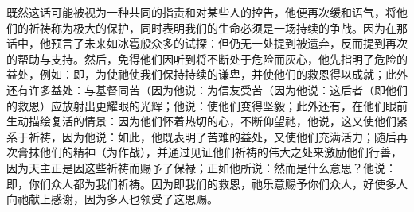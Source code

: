 既然这话可能被视为一种共同的指责和对某些人的控告，他便再次缓和语气，将他们的祈祷称为极大的保护，同时表明我们的生命必须是一场持续的争战。因为在那话中，他预言了未来如冰雹般众多的试探：但仍无一处提到被遗弃，反而提到再次的帮助与支持。然后，免得他们因听到将不断处于危险而灰心，他先指明了危险的益处，例如：即，为使祂使我们保持持续的谦卑，并使他们的救恩得以成就；此外还有许多益处：与基督同苦（因为他说：为信友受苦（因为他说：这后者（即他们的救恩）应放射出更耀眼的光辉；他说：使他们变得坚毅；此外还有，在他们眼前生动描绘复活的情景：因为他们怀着热切的心，不断仰望祂，他说，这又使他们紧系于祈祷，因为他说：如此，他既表明了苦难的益处，又使他们充满活力；随后再次膏抹他们的精神（为作战），并通过见证他们祈祷的伟大之处来激励他们行善，因为天主正是因这些祈祷而赐予了保禄；正如他所说：然而是什么意思？他说：即，你们众人都为我们祈祷。因为即我们的救恩，祂乐意赐予你们众人，好使多人向祂献上感谢，因为多人也领受了这恩赐。\par

